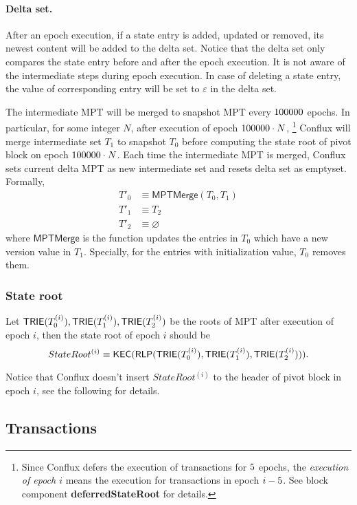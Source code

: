 \paragraph{Delta set.}

After an epoch execution, if a state entry is added, updated or removed, its newest content will be added to the delta set. Notice that the delta set only compares the state entry before and after the epoch execution. It is not aware of the intermediate steps during epoch execution. 
%
In case of deleting a state entry, the value of corresponding entry will be set to $\varepsilon$ in the delta set. 

The intermediate MPT will be merged to snapshot MPT every $100000$ epochs. In particular, for some integer $N$, after execution of epoch $100000\cdot N$, \footnote{Since Conflux defers the execution of transactions for ${5}$ epochs, the \emph{execution of epoch $i$} means the execution for transactions in epoch $i-{5}$. See block component {\bf deferredStateRoot} for details.} Conflux will merge intermediate set $T_1$ to snapshot $T_0$ before computing the state root of pivot block on epoch $100000\cdot N$. Each time the intermediate MPT is merged, Conflux sets current delta MPT as new intermediate set and resets delta set as emptyset. Formally,  
\begin{align}
	T'_0 &\equiv \mathsf{MPTMerge}(T_0,T_1) \\
	T'_1 &\equiv T_2 \\
	T'_2 &\equiv \varnothing
\end{align}
%
where $\mathsf{MPTMerge}$ is the function updates the entries in $T_0$ which have a new version value in $T_1$. Specially, for the entries with initialization value, $T_0$ removes them.  


\subsubsection{State root}

Let $\mathsf{TRIE}(T^{(i)}_0),\mathsf{TRIE}(T^{(i)}_1),\mathsf{TRIE}(T^{(i)}_2)$ be the roots of MPT after execution of epoch $i$, then the state root of epoch $i$ should be 
%
$$ StateRoot^{(i)}\equiv\mathsf{KEC}(\mathsf{RLP}(\mathsf{TRIE}(T^{(i)}_0),\mathsf{TRIE}(T^{(i)}_1),\mathsf{TRIE}(T^{(i)}_2))).$$

Notice that Conflux doesn't insert $StateRoot^{(i)}$ to the header of pivot block in epoch $i$, see the following for details. 


\subsection{Transactions}
\label{sec:tx}

